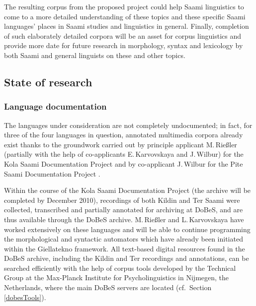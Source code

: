 \documentclass[a4paper,12pt]{article}
\begin{document}
The resulting corpus from the proposed project could help Saami linguistics to come to a more detailed understanding of these topics and these specific Saami languages' places in Saami studies and linguistics in general. Finally, completion of such elaborately detailed corpora will be an asset for corpus linguistics and provide more date for future research in morphology, syntax and lexicology by both Saami and general linguists on these and other topics.

\subsection{State of research}
\subsubsection{Language documentation}

The languages under consideration are not completely undocumented; in fact, for three of the four languages in question, annotated multimedia corpora already exist thanks to the groundwork carried out by principle applicant M.\,Rießler (partially with the help of co-applicants E.\,Karvovskaya and J.\,Wilbur) for the Kola Saami Documentation Project \cite[a DoBeS project, cf.][]{KSDP} and by co-applicant J.\,Wilbur for the Pite Saami Documentation Project \cite[a Hans Rausing Endangered Languages Project, cf.][]{PSDP}.

Within the course of the Kola Saami Documentation Project (the archive will be completed by December 2010), recordings of both Kildin and Ter Saami were collected, transcribed and partially annotated for archiving at DoBeS, and are thus available through the DoBeS archive. M.\,Rießler and L.\,Karvovskaya have worked extensively on these languages and will be able to continue programming the morphological and syntactic automators which have already been initiated within the Giellatekno framework. All text-based digital resources found in the DoBeS archive, including the Kildin and Ter recordings and annotations, can be searched efficiently with the help of corpus tools developed by the Technical Group at the Max-Planck Institute for Psycholinguistics in Nijmegen, the Netherlands, where the main DoBeS servers are located (cf.~Section \ref{dobesTools}).
\end{document}
